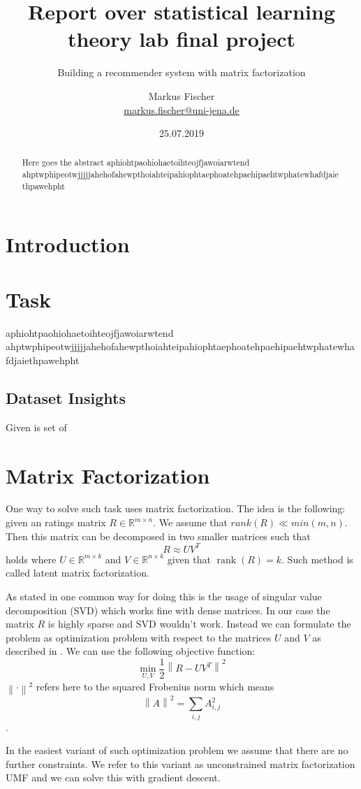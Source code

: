\documentclass[]{scrartcl}
\title{Report over statistical learning theory lab final project}
\subtitle{Building a recommender system with matrix factorization}
\author{Markus Fischer\\ \small{\href{mailto:markus.fischer@uni-jena.de}{markus.fischer@uni-jena.de}}}
\date{25.07.2019}
\DeclareMathOperator{\rank}{rank}
\newcommand{\norm}[1]{\left\lVert#1\right\rVert}
\begin{document}
\maketitle
\begin{abstract}
Here goes the abstract aphiohtpaohiohaetoihteojfjawoiarwtend ahptwphipeotwjjjjjahehofahewpthoiahteipahiophtaephoatehpaehipaehtwphatewhafdjaiethpawehpht
\end{abstract}

\section{Introduction}

\section{Task}
aphiohtpaohiohaetoihteojfjawoiarwtend~\cite{ShSh14} ahptwphipeotwjjjjjahehofahewpthoiahteipahiophtaephoatehpaehipaehtwphatewhafdjaiethpawehpht

\subsection{Dataset Insights}
Given is set of

\section{Matrix Factorization}
One way to solve such task uses matrix factorization. The idea is the following: given an ratings matrix $R\in\mathbb{R}^{m\times n}$. We assume that $rank(R)\ll min(m,n)$. Then this matrix can be decomposed in two smaller matrices such that 
$$R\approx UV^T$$ holds where $U\in\mathbb{R}^{m\times k}$ and $V\in\mathbb{R}^{n\times k}$ given that $\rank(R)=k$. Such method is called latent matrix factorization.

As stated in \cite{KoBeVo09} one common way for doing this is the usage of singular value decomposition (SVD) which works fine with dense matrices. In our case the matrix $R$ is highly sparse and SVD wouldn't work. Instead we can formulate the problem as optimization problem with respect to the matrices $U$ and $V$ as described in \cite{Ag16}. We can use the following objective function: 
$$\min_{U,V} \frac{1}{2}\norm{R-UV^T}^2$$ 
$\norm{\cdot}^2$ refers here to the squared Frobenius norm which means $$\norm{A}^2=\sum_{i,j}A_{i,j}^2$$.

In the easiest variant of such optimization problem we assume that there are no further constraints. We refer to this variant as unconstrained matrix factorization UMF and we can solve this with gradient descent.
\end{document}
